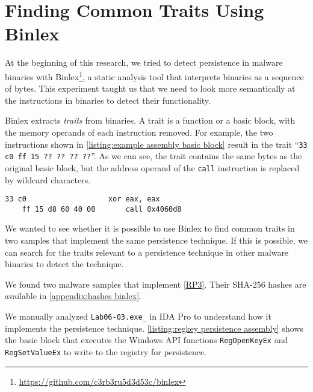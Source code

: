 \chapter{Finding Common Traits Using Binlex}\label{appendix:binlex experiment}
At the beginning of this research, we tried to detect persistence in malware binaries with Binlex\footnote{\tiny \url{https://github.com/c3rb3ru5d3d53c/binlex}}, a static analysis tool that interprets binaries as a sequence of bytes. This experiment taught us that we need to look more semantically at the instructions in binaries to detect their functionality.

\medskip

Binlex extracts \emph{traits} from binaries. A trait is a function or a basic block, with the memory operands of each instruction removed. For example, the two instructions shown in \autoref{listing:example assembly basic block} result in the trait ``\texttt{33 c0 ff 15 ?? ?? ?? ??}''. As we can see, the trait contains the same bytes as the original basic block, but the address operand of the \texttt{call} instruction is replaced by wildcard characters.

\begin{lstlisting}[captionpos=b, caption={An example of a basic block made up of two instructions.}, label={listing:example assembly basic block}]
    33 c0                   xor eax, eax
    ff 15 d8 60 40 00       call 0x4060d8
\end{lstlisting}

We wanted to see whether it is possible to use Binlex to find common traits in two samples that implement the same persistence technique. If this is possible, we can search for the traits relevant to a persistence technique in other malware binaries to detect the technique.

We found two malware samples that implement \autoref{RP3}. Their SHA-256 hashes are available in \autoref{appendix:hashes binlex}.

We manually analyzed \texttt{Lab06-03.exe\_} in IDA Pro to understand how it implements the persistence technique. \autoref{listing:regkey persistence assembly} shows the basic block that executes the Windows API functions \texttt{RegOpenKeyEx} and \texttt{RegSetValueEx} to write to the registry for persistence.

